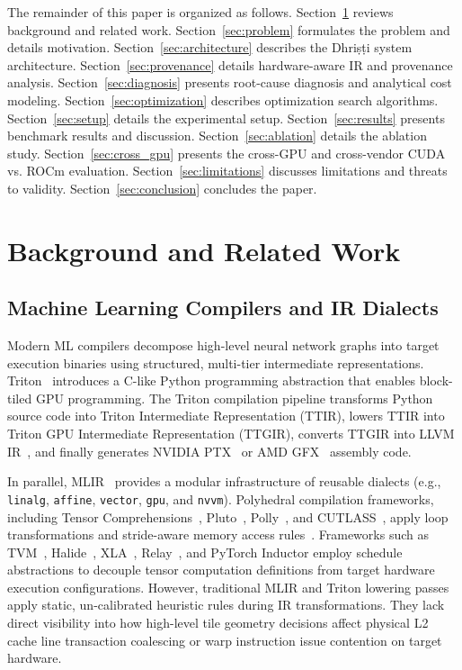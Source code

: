 \documentclass[10pt,journal,compsoc]{IEEEtran}
\begin{document}
The remainder of this paper is organized as follows. Section~\ref{sec:background} reviews background and related work. Section~\ref{sec:problem} formulates the problem and details motivation. Section~\ref{sec:architecture} describes the Dhri\d{s}\d{t}i system architecture. Section~\ref{sec:provenance} details hardware-aware IR and provenance analysis. Section~\ref{sec:diagnosis} presents root-cause diagnosis and analytical cost modeling. Section~\ref{sec:optimization} describes optimization search algorithms. Section~\ref{sec:setup} details the experimental setup. Section~\ref{sec:results} presents benchmark results and discussion. Section~\ref{sec:ablation} details the ablation study. Section~\ref{sec:cross_gpu} presents the cross-GPU and cross-vendor CUDA vs. ROCm evaluation. Section~\ref{sec:limitations} discusses limitations and threats to validity. Section~\ref{sec:conclusion} concludes the paper.

\section{Background and Related Work}\label{sec:background}

\subsection{Machine Learning Compilers and IR Dialects}
Modern ML compilers decompose high-level neural network graphs into target execution binaries using structured, multi-tier intermediate representations. Triton~\cite{tillet2019triton} introduces a C-like Python programming abstraction that enables block-tiled GPU programming. The Triton compilation pipeline transforms Python source code into Triton Intermediate Representation (TTIR), lowers TTIR into Triton GPU Intermediate Representation (TTGIR), converts TTGIR into LLVM IR~\cite{lattner2004llvm}, and finally generates NVIDIA PTX~\cite{nvptx2023spec} or AMD GFX~\cite{amd2023rdna} assembly code.

In parallel, MLIR~\cite{lattner2021mlir} provides a modular infrastructure of reusable dialects (e.g., \texttt{linalg}, \texttt{affine}, \texttt{vector}, \texttt{gpu}, and \texttt{nvvm}). Polyhedral compilation frameworks, including Tensor Comprehensions~\cite{vasilache2018tensor}, Pluto~\cite{bondhugula2008practical}, Polly~\cite{grosser2012polly}, and CUTLASS~\cite{zheng2023cutlass}, apply loop transformations and stride-aware memory access rules~\cite{elango2018stride}. Frameworks such as TVM~\cite{chen2018tvm}, Halide~\cite{ragan2013halide}, XLA~\cite{sabne2020xla}, Relay~\cite{roesch2019relay}, and PyTorch Inductor employ schedule abstractions to decouple tensor computation definitions from target hardware execution configurations. However, traditional MLIR and Triton lowering passes apply static, un-calibrated heuristic rules during IR transformations. They lack direct visibility into how high-level tile geometry decisions affect physical L2 cache line transaction coalescing or warp instruction issue contention on target hardware.
\end{document}
